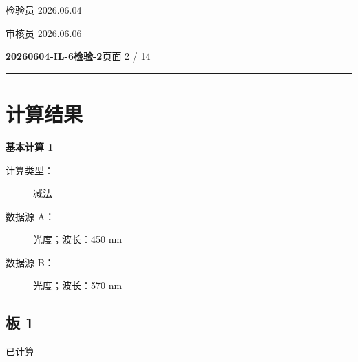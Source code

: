 \documentclass[UTF8,10pt,a4paper,fontset=fandol]{ctexart}
\newcommand{\handwritten}[1]{#1}
\begin{document}

\bigskip

\handwritten{检验员}
\qquad
\handwritten{2026.06.04}

\medskip

\handwritten{审核员}
\qquad
\handwritten{2026.06.06}


\newpage

\noindent\textbf{20260604-IL-6检验-2}\hfill 页面 2 / 14

\medskip
\hrule
\medskip

\section*{计算结果}

\textbf{基本计算 1}

\begin{description}
  \item[计算类型：] 减法
  \item[数据源 A：] 光度；波长：450 nm
  \item[数据源 B：] 光度；波长：570 nm
\end{description}

\subsection*{板 1}

已计算

\medskip
\end{document}
